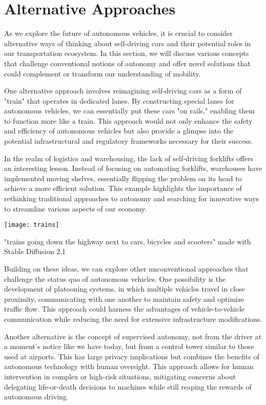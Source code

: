 \section{Alternative Approaches}

As we explore the future of autonomous vehicles, it is crucial to consider alternative ways of thinking about self-driving cars and their potential roles in our transportation ecosystem. In this section, we will discuss various concepts that challenge conventional notions of autonomy and offer novel solutions that could complement or transform our understanding of mobility.

One alternative approach involves reimagining self-driving cars as a form of "train" that operates in dedicated lanes. By constructing special lanes for autonomous vehicles, we can essentially put these cars "on rails," enabling them to function more like a train. This approach would not only enhance the safety and efficiency of autonomous vehicles but also provide a glimpse into the potential infrastructural and regulatory frameworks necessary for their success.

In the realm of logistics and warehousing, the lack of self-driving forklifts offers an interesting lesson. Instead of focusing on automating forklifts, warehouses have implemented moving shelves, essentially flipping the problem on its head to achieve a more efficient solution. This example highlights the importance of rethinking traditional approaches to autonomy and searching for innovative ways to streamline various aspects of our economy.

\begin{marginfigure}[-5.5cm]
        \texttt{[image: trains]}
        \caption{"trains going down the highway next to cars, bicycles and scooters" made with Stable Diffusion 2.1}
\end{marginfigure}

Building on these ideas, we can explore other unconventional approaches that challenge the status quo of autonomous vehicles. One possibility is the development of platooning systems, in which multiple vehicles travel in close proximity, communicating with one another to maintain safety and optimize traffic flow. This approach could harness the advantages of vehicle-to-vehicle communication while reducing the need for extensive infrastructure modifications.

Another alternative is the concept of supervised autonomy, not from the driver at a moment's notice like we have today, but from a control tower similar to those used at airports. This has large privacy implications but combines the benefits of autonomous technology with human oversight. This approach allows for human intervention in complex or high-risk situations, mitigating concerns about delegating life-or-death decisions to machines while still reaping the rewards of autonomous driving.

